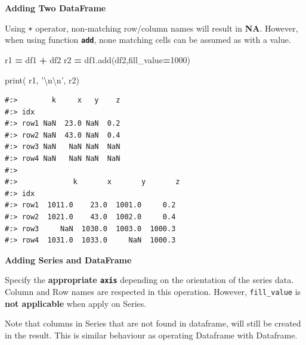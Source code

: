 \documentclass[
]{book}
\newenvironment{Shaded}{\begin{snugshade}}{\end{snugshade}}
\newcommand{\BuiltInTok}[1]{#1}
\newcommand{\CharTok}[1]{\textcolor[rgb]{0.5,0.5,0.5}{#1}}
\newcommand{\DecValTok}[1]{\textcolor[rgb]{0.06,0.06,0.06}{#1}}
\newcommand{\NormalTok}[1]{#1}
\newcommand{\OperatorTok}[1]{\textcolor[rgb]{0.43,0.43,0.43}{\textbf{#1}}}
\newcommand{\StringTok}[1]{\textcolor[rgb]{0.5,0.5,0.5}{#1}}
\begin{document}
\textbf{Adding Two DataFrame}

Using \texttt{+} operator, non-matching row/column names will result in \textbf{NA}. However, when using function \textbf{\texttt{add}}, none matching cells can be assumed as with a value.

\begin{Shaded}
\begin{Highlighting}[]
\NormalTok{r1 }\OperatorTok{=}\NormalTok{ df1 }\OperatorTok{+}\NormalTok{ df2}
\NormalTok{r2 }\OperatorTok{=}\NormalTok{ df1.add(df2,fill_value}\OperatorTok{=}\DecValTok{1000}\NormalTok{)}

\BuiltInTok{print}\NormalTok{( r1, }\StringTok{'}\CharTok{\textbackslash{}n\textbackslash{}n}\StringTok{'}\NormalTok{, r2)}
\end{Highlighting}
\end{Shaded}

\begin{verbatim}
#:>        k     x   y    z
#:> idx                    
#:> row1 NaN  23.0 NaN  0.2
#:> row2 NaN  43.0 NaN  0.4
#:> row3 NaN   NaN NaN  NaN
#:> row4 NaN   NaN NaN  NaN 
#:> 
#:>             k       x       y       z
#:> idx                                 
#:> row1  1011.0    23.0  1001.0     0.2
#:> row2  1021.0    43.0  1002.0     0.4
#:> row3     NaN  1030.0  1003.0  1000.3
#:> row4  1031.0  1033.0     NaN  1000.3
\end{verbatim}

\textbf{Adding Series and DataFrame}

Specify the \textbf{appropriate \texttt{axis}} depending on the orientation of the series data. Column and Row names are respected in this operation. However, \texttt{fill\_value} is \textbf{not applicable} when apply on Series.

Note that columns in Series that are not found in dataframe, will still be created in the result. This is similar behaviour as operating Dataframe with Dataframe.
\end{document}
